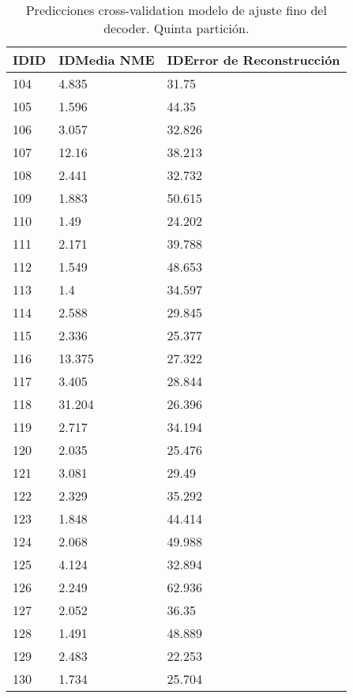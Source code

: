 \begin{table}[!ht]
    \centering
    \caption{Predicciones cross-validation modelo de ajuste fino del  decoder. Quinta partición.}
    \begin{tabular}{|l|l|l|}
    \hline
    \cellcolor{gray!25}\textbf{ID}\textbf{ID} & \cellcolor{gray!25}\textbf{ID}\textbf{Media NME} & \cellcolor{gray!25}\textbf{ID}\textbf{Error de Reconstrucción} \\ \hline
        104 & 4.835 & 31.75 \\ \hline
        105 & 1.596 & 44.35 \\ \hline
        106 & 3.057 & 32.826 \\ \hline
        107 & 12.16 & 38.213 \\ \hline
        108 & 2.441 & 32.732 \\ \hline
        109 & 1.883 & 50.615 \\ \hline
        110 & 1.49 & 24.202 \\ \hline
        111 & 2.171 & 39.788 \\ \hline
        112 & 1.549 & 48.653 \\ \hline
        113 & 1.4 & 34.597 \\ \hline
        114 & 2.588 & 29.845 \\ \hline
        115 & 2.336 & 25.377 \\ \hline
        116 & 13.375 & 27.322 \\ \hline
        117 & 3.405 & 28.844 \\ \hline
        118 & 31.204 & 26.396 \\ \hline
        119 & 2.717 & 34.194 \\ \hline
        120 & 2.035 & 25.476 \\ \hline
        121 & 3.081 & 29.49 \\ \hline
        122 & 2.329 & 35.292 \\ \hline
        123 & 1.848 & 44.414 \\ \hline
        124 & 2.068 & 49.988 \\ \hline
        125 & 4.124 & 32.894 \\ \hline
        126 & 2.249 & 62.936 \\ \hline
        127 & 2.052 & 36.35 \\ \hline
        128 & 1.491 & 48.889 \\ \hline
        129 & 2.483 & 22.253 \\ \hline
        130 & 1.734 & 25.704 \\ \hline
    \end{tabular}
\end{table}


\endinput
